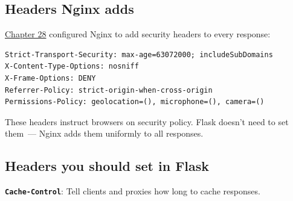 \subsection*{Headers Nginx adds}\label{34-response-handling:headers-nginx-adds}

\hyperref[ch:28-traffic-routing]{Chapter 28} configured Nginx to add security headers to every response:

\begin{outputbox}[short]
\begin{Verbatim}[fontsize=\codesize, breaklines, breakanywhere, breaksymbolleft={\tiny\textcolor{muted}{$\hookrightarrow$}}]
Strict-Transport-Security: max-age=63072000; includeSubDomains
X-Content-Type-Options: nosniff
X-Frame-Options: DENY
Referrer-Policy: strict-origin-when-cross-origin
Permissions-Policy: geolocation=(), microphone=(), camera=()
\end{Verbatim}
\end{outputbox}

\noindent{}These headers instruct browsers on security policy. Flask doesn't need to set them~--- Nginx adds them uniformly to all responses.

\subsection*{Headers you should set in Flask}\label{34-response-handling:headers-you-should-set-in-flask}

\textbf{\texttt{Cache-Control}}: Tell clients and proxies how long to cache responses.

\begin{codebox}[short]

\begin{Shaded}
\begin{Highlighting}[]
\NormalTok{response.headers[}\NormalTok{] }\OperatorTok{=} 

\NormalTok{response.headers[}\NormalTok{] }\OperatorTok{=} 

\end{Highlighting}
\end{Shaded}

\end{codebox}

